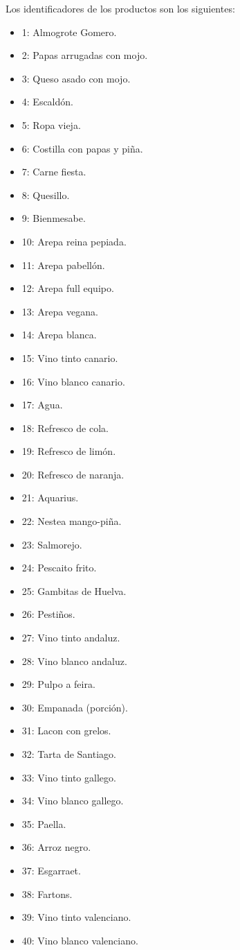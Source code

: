 \documentclass[12pt]{opticajnl}
\begin{document}
\noindent Los identificadores de los productos son los siguientes:
\begin{multicols}{3}
\begin{itemize}
\item 1: Almogrote Gomero.
\item 2: Papas arrugadas con mojo.
\item 3: Queso asado con mojo.
\item 4: Escaldón.
\item 5: Ropa vieja.
\item 6: Costilla con papas y piña.
\item 7: Carne fiesta.
\item 8: Quesillo.
\item 9: Bienmesabe.
\item 10: Arepa reina pepiada.
\item 11: Arepa pabellón.
\item 12: Arepa full equipo.
\item 13: Arepa vegana.
\item 14: Arepa blanca.
\item 15: Vino tinto canario.
\item 16: Vino blanco canario.
\item 17: Agua.
\item 18: Refresco de cola.
\item 19: Refresco de limón.
\item 20: Refresco de naranja.
\item 21: Aquarius.
\item 22: Nestea mango-piña.
\item 23: Salmorejo.
\item 24: Pescaito frito.
\item 25: Gambitas de Huelva.
\item 26: Pestiños.
\item 27: Vino tinto andaluz.
\item 28: Vino blanco andaluz.
\item 29: Pulpo a feira.
\item 30: Empanada (porción).
\item 31: Lacon con grelos.
\item 32: Tarta de Santiago.
\item 33: Vino tinto gallego.
\item 34: Vino blanco gallego.
\item 35: Paella.
\item 36: Arroz negro.
\item 37: Esgarraet. 
\item 38: Fartons. 
\item 39: Vino tinto valenciano.
\item 40: Vino blanco valenciano.
\end{itemize}
\end{multicols}
\end{document}
